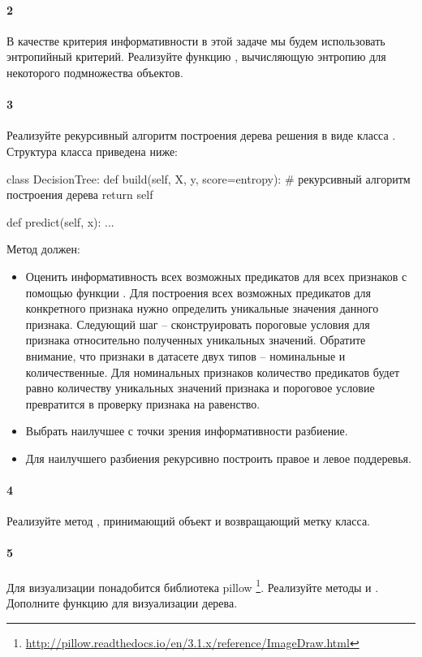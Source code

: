 \documentclass[a4paper,12pt]{article}
\begin{document}
\paragraph{2} В качестве критерия информативности в этой задаче мы будем использовать энтропийный критерий. Реализуйте функцию , вычисляющую энтропию для некоторого подмножества объектов.

\paragraph{3} Реализуйте рекурсивный алгоритм построения дерева решения в виде класса . Структура класса приведена ниже: 

\begin{python3}
class DecisionTree:
    def build(self, X, y, score=entropy):
        # рекурсивный алгоритм построения дерева
        return self
        
    def predict(self, x):
        ... 
\end{python3}
\clearpage
Метод  должен:
\begin{itemize}
	\item Оценить информативность всех возможных предикатов для всех признаков с помощью функции . 
	Для построения всех возможных предикатов для конкретного признака нужно определить уникальные значения данного признака. 
	Следующий шаг -- сконструировать пороговые условия для признака относительно полученных уникальных значений. 
	Обратите внимание, что признаки в датасете двух типов -- номинальные и количественные. 
	Для номинальных признаков количество предикатов будет равно количеству уникальных значений признака и пороговое условие превратится в проверку признака на равенство.
	\item Выбрать наилучшее с точки зрения информативности разбиение.
	\item Для наилучшего разбиения рекурсивно построить правое и левое поддеревья.
\end{itemize}

\paragraph{4} Реализуйте метод , принимающий объект  и возвращающий метку класса. 

\paragraph{5} Для визуализации понадобится библиотека pillow \footnote{\url{http://pillow.readthedocs.io/en/3.1.x/reference/ImageDraw.html}}. Реализуйте методы  и . Дополните функцию  для визуализации дерева.
\end{document}
